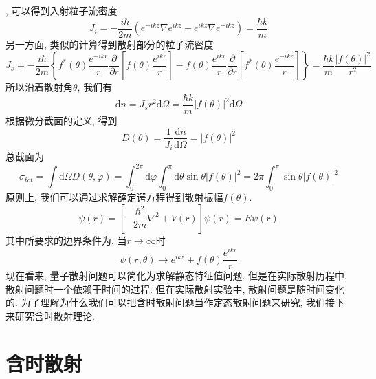 \documentclass[a4paper,11pt]{book}
\newcommand{\md}{\mathrm{d}}
\begin{document}
, 可以得到入射粒子流密度
\begin{equation}
  J_i=-\frac{i\hbar}{2m}(e^{-ikz}\nabla e^{ikz}-e^{ikz}\nabla e^{-ikz})=\frac{\hbar k}{m}
\end{equation}
另一方面, 类似的计算得到散射部分的粒子流密度
\begin{equation}
  J_s=-\frac{i\hbar}{2m}\left\{f^*(\theta)\frac{e^{-ikr}}{r}\frac{\partial}{\partial r}[f(\theta)\frac{e^{ikr}}{r}]-f(\theta)\frac{e^{ikr}}{r}\frac{\partial}{\partial r}[f^*(\theta)\frac{e^{-ikr}}{r}]\right\}=\frac{\hbar k}{m}\frac{|f(\theta)|^2}{r^2}
\end{equation}
所以沿着散射角$\theta$, 我们有
\begin{equation}
  \md n=J_s r^2\md \Omega=\frac{\hbar k}{m}|f(\theta)|^2\md\Omega
\end{equation}
根据微分截面的定义, 得到
\begin{equation}
  D(\theta)=\frac{1}{J_i}\frac{\md n}{\md\Omega}=|f(\theta)|^2
\end{equation}
总截面为
\begin{equation}
  \sigma_{tot}=\int\md\Omega D(\theta,\varphi)=\int_{0}^{2\pi}\md\varphi\int_{0}^{\pi}\md\theta\sin\theta |f(\theta)|^2=2\pi\int_{0}^{\pi}\sin\theta|f(\theta)|^2
\end{equation}
原则上, 我们可以通过求解薛定谔方程得到散射振幅$f(\theta)$.
\begin{equation}
  [\hat{H}_0+\hat{V}(r)]\psi(r)=\left[-\frac{\hbar^2}{2m}\nabla^2+V(r)\right]\psi(r)=E\psi(r)
\end{equation}
其中所要求的边界条件为, 当$r\to\infty$时
\begin{equation}
  \psi(r,\theta)\to e^{ikz}+f(\theta)\frac{e^{ikr}}{r}
\end{equation}
现在看来, 量子散射问题可以简化为求解静态特征值问题. 但是在实际散射历程中, 散射问题时一个依赖于时间的过程. 但在实际散射实验中, 散射问题是随时间变化的. 为了理解为什么我们可以把含时散射问题当作定态散射问题来研究, 我们接下来研究含时散射理论.
\section{含时散射}
\end{document}
